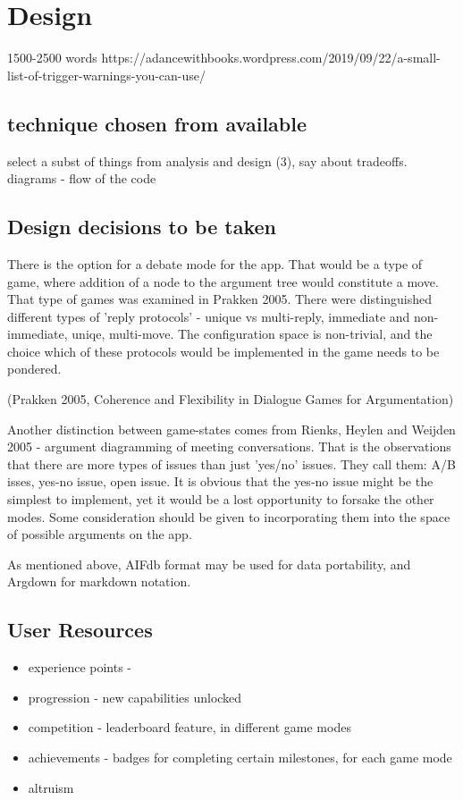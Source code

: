 \documentclass{article}
\begin{document}

\section{Design} 1500-2500 words
https://adancewithbooks.wordpress.com/2019/09/22/a-small-list-of-trigger-warnings-you-can-use/
\subsection{technique chosen from available }
select a subst of things from analysis and design (3), say about tradeoffs. diagrams - flow of the code


\subsection{Design decisions to be taken}
There is the option for a debate mode for the app.
That would be a type of game, where addition of a node to the argument tree would constitute a move.
That type of games was examined in Prakken 2005.
There were distinguished different types of 'reply protocols' - unique vs multi-reply, immediate and non-immediate, uniqe, multi-move.
The configuration space is non-trivial, and the choice which of these protocols would be implemented in the game needs to be pondered.

(Prakken 2005, Coherence and Flexibility in Dialogue Games for Argumentation)

Another distinction between game-states comes from Rienks, Heylen and Weijden 2005 - argument diagramming of meeting conversations.
That is the observations that there are more types of issues than just 'yes/no' issues.
They call them: A/B isses, yes-no issue, open issue.
It is obvious that the yes-no issue might be the simplest to implement, yet it would be a lost opportunity to forsake the other modes.
Some consideration should be given to incorporating them into the space of possible arguments on the app.

As mentioned above, AIFdb format may be used for data portability, and Argdown for markdown notation.

\subsection{User Resources}
\begin{itemize}
  \item experience points - 
  \item progression - new capabilities unlocked  
  \item competition - leaderboard feature, in different game modes
  \item achievements - badges for completing certain milestones, for each game mode
  \item altruism
\end{itemize}
\end{document}
